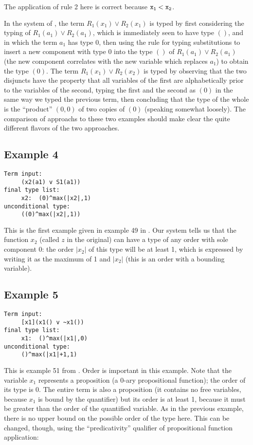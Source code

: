 \documentclass{article}
\begin{document}
The application of rule 2 here is correct because $\tt x_1 < \tt x_2$.

In the system of \cite{types40}, the term $R_1(x_1) \vee R_2(x_1)$ is
typed by first considering the typing of $R_1(a_1) \vee R_2(a_1)$,
which is immediately seen to have type $()$, and in which the term
$a_1$ has type $0$, then using the rule for typing substitutions to
insert a new component with type $0$ into the type $()$ of $R_1(a_1)
\vee R_2(a_1)$ (the new component correlates with the new variable
which replaces $a_1$) to obtain the type $(0)$.  The term $R_1(x_1)
\vee R_2(x_2)$ is typed by observing that the two disjuncts have the
property that all variables of the first are alphabetically prior to
the variables of the second, typing the first and the second as $(0)$
in the same way we typed the previous term, then concluding that the
type of the whole is the ``product'' $(0,0)$ of two copies of $(0)$
(speaking somewhat loosely).  The comparison of approachs to these two
examples should make clear the quite different flavors of the two
approaches.
\subsection{Example 4}
\begin{verbatim}
Term input:
     (x2(a1) v S1(a1))
final type list:
     x2:  (0)^max(|x2|,1)
unconditional type:
     ((0)^max(|x2|,1))
\end{verbatim}

This is the first example given in example 49 in \cite{types40}.  Our
system tells us that the function $x_2$ (called $z$ in the original)
can have a type of any order with sole component $0$: the order
$|x_2|$ of this type will be at least 1, which is expressed by writing
it as the maximum of 1 and $|x_2|$ (this is an order with a bounding
variable).
\subsection{Example 5}
\begin{verbatim}
Term input:
     [x1](x1() v ~x1())
final type list:
     x1:  ()^max(|x1|,0)
unconditional type:
     ()^max(|x1|+1,1)
\end{verbatim}

This is example 51 from \cite{types40}.  Order is important in this
example.  Note that the variable $x_1$ represents a proposition (a
0-ary propositional function); the order of its type is 0.  The entire
term is also a proposition (it contains no free variables, because
$x_1$ is bound by the quantifier) but its order is at least 1, because
it must be greater than the order of the quantified variable.  As in
the previous example, there is no upper bound on the possible order of
the type here.  This can be changed, though, using the
``predicativity'' qualifier of propositional function application:
\end{document}
